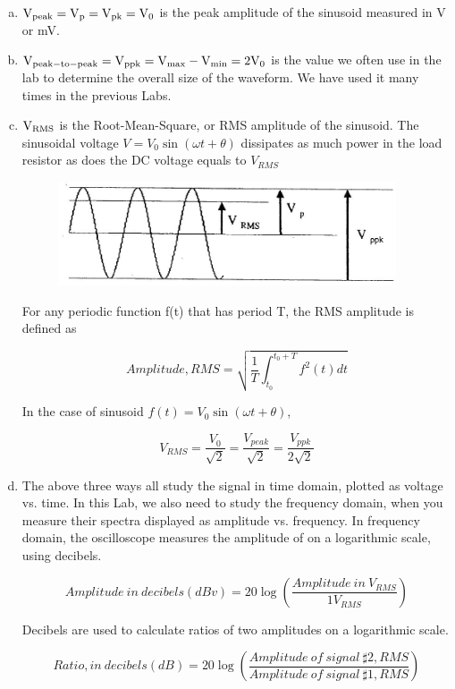 \documentclass{article}
\begin{document}
\begin{enumerate}[a)]
\item
$\rm V_{peak}=V_p=V_{pk}=V_0$ is the peak amplitude of the sinusoid measured in V or mV.
\item
$\rm V_{peak-to-peak}=V_{ppk}=V_{max}-V_{min}=2V_0$ is the value we often use in the lab to
determine the overall size of the waveform. We have used it many times in the previous Labs.
\item
$\rm V_{RMS}$ is the Root-Mean-Square, or RMS amplitude of the sinusoid. The
sinusoidal voltage $V=V_0\sin(\omega t+\theta)$ dissipates as much power in the load resistor
as does the DC voltage equals to $V_{RMS}$

\begin{figure}[!h]
	\centering
	\includegraphics[width=10cm]{p4.jpg}
	\label{fig-4}
\end{figure}

For any periodic function f(t) that has period T, the RMS amplitude is defined as

$$Amplitude,RMS=\sqrt{\frac{1}{T}\int_{t_0}^{t_0+T}f^2(t)dt}$$

In the case of sinusoid $f(t)=V_0\sin(\omega t+\theta)$,

$$V_{RMS}=\frac{V_0}{\sqrt{2}}=\frac{V_{peak}}{\sqrt{2}}=\frac{V_{ppk}}{2\sqrt{2}}$$

\item

The above three ways all study the signal in time domain, plotted as voltage vs.
time. In this Lab, we also need to study the frequency domain, when you measure
their spectra displayed as amplitude vs. frequency. In frequency domain, the
oscilloscope measures the amplitude of on a logarithmic scale, using decibels.

$$Amplitude\ in\ decibels(dBv)=20\log\left(\frac{Amplitude\ in\ V_{RMS}}{1V_{RMS}}\right)$$

Decibels are used to calculate ratios of two amplitudes on a logarithmic scale.

$$Ratio,in\ decibels(dB)=20\log\left(\frac{Amplitude\ of\ signal\ \sharp 2,RMS}{Amplitude\ of\ signal\ \sharp 1,RMS}\right)$$

\end{enumerate}
\end{document}
